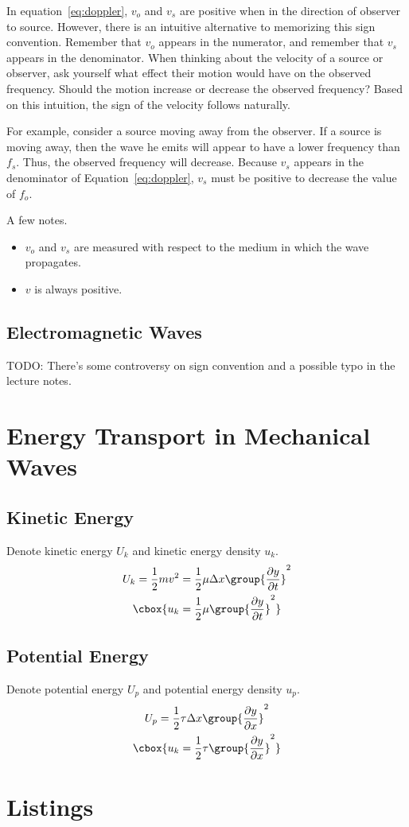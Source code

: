 \documentclass{hw}
\numberwithin{equation}{section}
\begin{document}
In equation~\eqref{eq:doppler}, $v_o$ and $v_s$ are positive when in the
direction of observer to source. However, there is an intuitive alternative to
memorizing this sign convention. Remember that $v_o$ appears in the numerator,
and remember that $v_s$ appears in the denominator. When thinking about the
velocity of a source or observer, ask yourself what effect their motion would
have on the observed frequency. Should the motion increase or decrease the
observed frequency? Based on this intuition, the sign of the velocity follows
naturally.

For example, consider a source moving away from the observer. If a source is
moving away, then the wave he emits will appear to have a lower frequency than
$f_s$. Thus, the observed frequency will decrease. Because $v_s$ appears in the
denominator of Equation~\eqref{eq:doppler}, $v_s$ must be positive to decrease
the value of $f_o$.

A few notes.
\begin{itemize}
  \item $v_o$ and $v_s$ are measured with respect to the medium in which the
    wave propagates.
  \item $v$ is always positive.
\end{itemize}

\subsection{Electromagnetic Waves}
TODO: There's some controversy on sign convention and a possible typo in the
lecture notes.

\section{Energy Transport in Mechanical Waves}
\subsection{Kinetic Energy}
Denote kinetic energy $U_k$ and kinetic energy density $u_k$.
\begin{gather}
  U_k = \frac{1}{2} m v^2 
      = \frac{1}{2} \mu \Delta x \group{\frac{\partial y}{\partial t}}^2 \\
  \cbox{%
  u_k = \frac{1}{2} \mu \group{\frac{\partial y}{\partial t}}^2
  }
\end{gather}

\subsection{Potential Energy}
Denote potential energy $U_p$ and potential energy density $u_p$.
\begin{gather}
  U_p = \frac{1}{2} \tau \Delta x \group{\frac{\partial y}{\partial x}}^2 \\
  \cbox{%
  u_k = \frac{1}{2} \tau \group{\frac{\partial y}{\partial x}}^2
  }
\end{gather}

\section{Listings}
\end{document}
